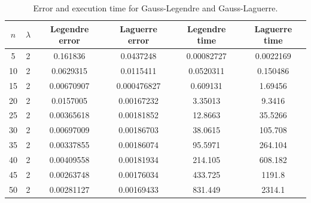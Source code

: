 \documentclass{article}
\begin{document}
  \begin{table}[ht]
    \centering
    \caption{Error and execution time for Gauss-Legendre and Gauss-Laguerre.}
    \vspace{2mm}
    \label{tab:error-gauss}
    \begin{tabular}{|c|c|c|c|c|c|}
        \hline
        $n$ & $\lambda$ & Legendre error & Laguerre error & Legendre time & Laguerre time   \\
        \hline \hline
        5 & 2 & 0.161836 & 0.0437248 & 0.00082727 & 0.0022169 \\
        10 & 2 & 0.0629315 & 0.0115411 & 0.0520311 & 0.150486 \\
        15 & 2 & 0.00670907 & 0.000476827 & 0.609131 & 1.69456 \\
        20 & 2 & 0.0157005 & 0.00167232 & 3.35013 & 9.3416 \\
        25 & 2 & 0.00365618 & 0.00181852 & 12.8663 & 35.5266 \\
        30 & 2 & 0.00697009 & 0.00186703 & 38.0615 & 105.708 \\
        35 & 2 & 0.00337855 & 0.00186074 & 95.5971 & 264.104 \\
        40 & 2 & 0.00409558 & 0.00181934 & 214.105 & 608.182 \\
        45 & 2 & 0.00263748 & 0.00176034 & 433.725 & 1191.8 \\
        50 & 2 & 0.00281127 & 0.00169433 & 831.449 & 2314.1 \\
        \hline
    \end{tabular} \\
    \hspace{0pt}\\
  \end{table}
\end{document}
